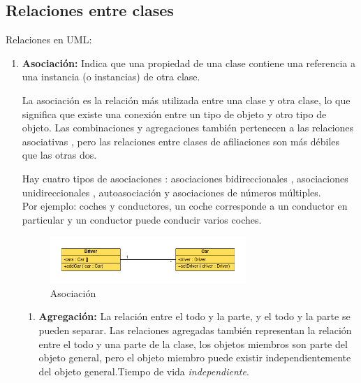 \documentclass[../main.tex]{subfiles}
\begin{document}
    \subsection{Relaciones entre clases}
        Relaciones en UML: \cite{uml_relacion_clases}
        \begin{enumerate}
            \item \textbf{Asociación:} Indica que una propiedad de una clase contiene una referencia a una instancia (o instancias) de otra clase.
            
            La asociación es la relación más utilizada entre una clase y otra clase, lo que significa que existe una conexión entre un tipo de objeto y otro tipo de objeto. Las combinaciones y agregaciones también pertenecen a las relaciones asociativas , pero las relaciones entre clases de afiliaciones son más débiles que las otras dos.
            
            Hay cuatro tipos de asociaciones : asociaciones bidireccionales , asociaciones unidireccionales , autoasociación y asociaciones de números múltiples.\\
            
            Por ejemplo: coches y conductores, un coche corresponde a un conductor en particular y un conductor puede conducir varios coches.

            \begin{figure}[ht]
                \centering
                \includegraphics[width=0.7\textwidth]{../images/uml_asociacion.png}
                \caption{Asociación}
                \label{fig:uml_asociacion}
            \end{figure}

                \begin{enumerate}
                    \item \textbf{Agregación:} 
                        La relación entre el todo y la parte, y el todo y la parte se pueden separar.
                        Las relaciones agregadas también representan la relación entre el todo y una parte de la clase, los objetos miembros son parte del objeto general, pero el objeto miembro puede existir independientemente del objeto general.Tiempo de vida \textit{independiente}.\\


\end{enumerate}
\end{enumerate}
\end{document}
